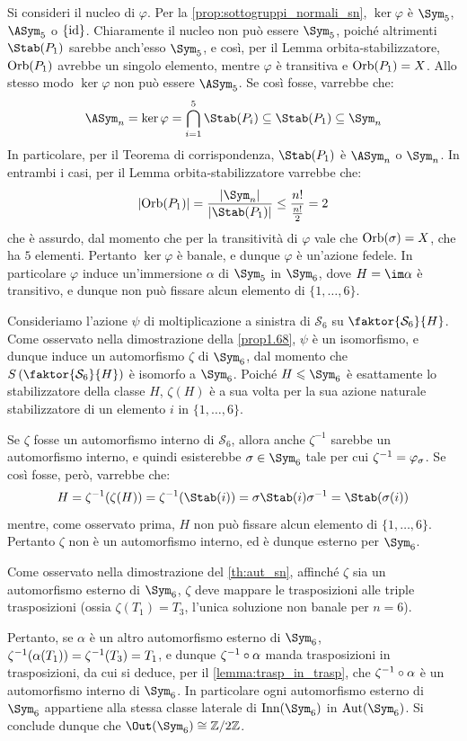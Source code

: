\documentclass[11pt]{scrartcl}
\begin{document}
	
	Si consideri il nucleo di $\varphi$. Per la \autoref{prop:sottogruppi_normali_sn},
	$\ker \varphi$ è $\Sym_5$, $\ASym_5$ o $\{\mathrm{id}\}$. Chiaramente il nucleo non può
	essere $\Sym_5$, poiché altrimenti $\Stab(P_1)$ sarebbe anch'esso $\Sym_5$, e così,
	per il Lemma orbita-stabilizzatore, $\operatorname{Orb}(P_1)$ avrebbe un singolo elemento, mentre
	$\varphi$ è transitiva e $\operatorname{Orb}(P_1) = X$. Allo stesso modo $\ker \varphi$ non può
	essere $\ASym_5$. Se così fosse, varrebbe che:
	\[ \ASym_n = \ker \varphi = \bigcap_{i=1}^5 \Stab(P_i) \subseteq \Stab(P_1) \subseteq \Sym_n \]
	In particolare, per il Teorema di corrispondenza, $\Stab(P_1)$ è $\ASym_n$ o $\Sym_n$. In entrambi
	i casi,
	per il Lemma orbita-stabilizzatore varrebbe che:
	\[ \abs{\Orb(P_1)} = \frac{\abs{\Sym_n}}{\abs{\Stab(P_1)}} \leq \frac{n!}{\frac{n!}{2}} = 2 \]
	che è assurdo, dal momento che per la transitività di $\varphi$ vale che $\operatorname{Orb}(\sigma) = X$, che ha
	$5$ elementi. Pertanto $\ker \varphi$ è banale, e dunque $\varphi$ è un'azione fedele. In particolare $\varphi$ induce un'immersione $\alpha$ di $\Sym_5$ in
	$\Sym_6$, dove $H = \im \alpha$ è transitivo, e dunque non può fissare
	alcun elemento di $\{1, \ldots, 6\}$. \medskip

	
	Consideriamo l'azione $\psi$ di moltiplicazione a sinistra di $\mathcal{S}_6$ su 
	$\faktor{\mathcal{S}_6}{H}$. Come osservato nella dimostrazione della \autoref{prop1.68},
	$\psi$ è un isomorfismo, e dunque induce un automorfismo $\zeta$ di $\Sym_6$, dal momento che
	$S\left(\faktor{\mathcal{S}_6}{H}\right)$ è isomorfo a $\Sym_6$.
	Poiché $H \leqslant \Sym_6$ è esattamente lo stabilizzatore della
	classe $H$, $\zeta(H)$ è a sua volta per la sua azione naturale
	stabilizzatore di un elemento
	$i$ in $\{1, \ldots, 6\}$. \medskip 


	Se $\zeta$ fosse un automorfismo interno di $\mathcal{S}_6$,
	allora anche $\zeta^{-1}$ sarebbe un automorfismo interno, e quindi
	esisterebbe $\sigma \in \Sym_6$ tale per cui $\zeta^{-1} = \varphi_\sigma$.
	Se così fosse, però, varrebbe che:
	\[ H = \zeta\inv(\zeta(H)) = \zeta\inv(\Stab(i)) = \sigma \Stab(i) \sigma\inv = \Stab(\sigma(i)) \]
	mentre, come osservato prima, $H$ non può fissare alcun elemento di
	$\{1, \ldots, 6\}$. Pertanto $\zeta$ non è un automorfismo interno,
	ed è dunque esterno per $\Sym_6$.
	
	\begin{remark}
		Come osservato nella dimostrazione del \autoref{th:aut_sn}, affinché
		$\zeta$ sia un automorfismo esterno di $\Sym_6$, $\zeta$ deve mappare
		le trasposizioni alle triple trasposizioni (ossia $\zeta(T_1) = T_3$,
		l'unica soluzione non banale per $n = 6$). \medskip
		
		
		Pertanto, se $\alpha$ è un altro automorfismo esterno di $\Sym_6$,
		$\zeta^{-1}(\alpha(T_1)) = \zeta^{-1}(T_3) = T_1$, e dunque
		$\zeta^{-1} \circ \alpha$ manda trasposizioni in trasposizioni, da cui
		si deduce, per il \autoref{lemma:trasp_in_trasp}, che $\zeta^{-1} \circ \alpha$
		è un automorfismo interno di $\Sym_6$. In particolare ogni automorfismo esterno
		di $\Sym_6$ appartiene alla stessa classe laterale di $\Inn(\Sym_6)$ in
		$\Aut(\Sym_6)$. Si conclude dunque che $\Out(\Sym_6) \cong \Z{2}$.
	\end{remark}
	
\end{document}
